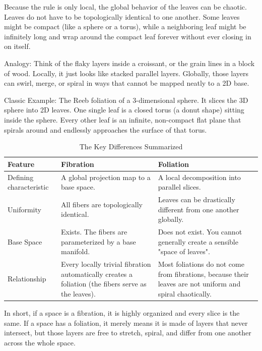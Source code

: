  Because the rule is only local, the global behavior of the leaves can be
 chaotic. Leaves do not have to be topologically identical to one another. Some
 leaves might be compact (like a sphere or a torus), while a neighboring leaf
 might be infinitely long and wrap around the compact leaf forever without ever
 closing in on itself.

Analogy: Think of the flaky layers inside a croissant, or the grain lines in a
block of wood. Locally, it just looks like stacked parallel layers. Globally,
those layers can swirl, merge, or spiral in ways that cannot be mapped neatly
to a 2D base.

Classic Example: The Reeb foliation of a 3-dimensional sphere. It slices the 3D
sphere into 2D leaves. One single leaf is a closed torus (a donut shape)
sitting inside the sphere. Every other leaf is an infinite, non-compact flat
plane that spirals around and endlessly approaches the surface of that torus.


\begin{table}[h]
    \centering
    \caption{The Key Differences Summarized}
    \begin{tabular}{p{} p{} p{}}
        \toprule
        Feature	&Fibration	&Foliation\\
        \midrule
        Defining characteristic&	A global projection map to a base space. &	A local decomposition into parallel slices.\\
        Uniformity&	All fibers are topologically identical. &	Leaves can be drastically different from one another globally.\\
        Base Space&	Exists. The fibers are parameterized by a base manifold.&	Does not exist. You cannot generally create a sensible "space of leaves".\\
        Relationship&	Every locally trivial fibration automatically creates a foliation (the fibers serve as the leaves).	&Most foliations do not come from fibrations, because their leaves are not uniform and spiral chaotically.\\
  \bottomrule    
  \end{tabular}  
\end{table}


In short, if a space is a fibration, it is highly organized and every slice is
the same. If a space has a foliation, it merely means it is made of layers that
never intersect, but those layers are free to stretch, spiral, and differ from
one another across the whole space.

